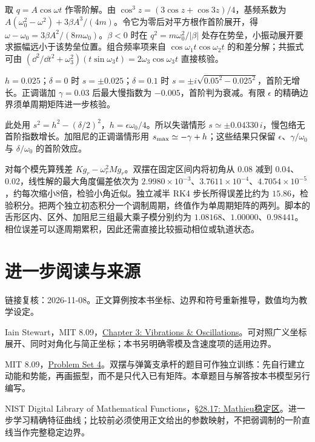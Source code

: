 \begin{bookexercises}
取 $q=A\cos\omega t$ 作零阶解。由 $\cos^3z=(3\cos z+\cos3z)/4$，基频系数为 $A(\omega_0^2-\omega^2)+3\beta A^3/(4m)$。令它为零后对平方根作首阶展开，得 $\omega-\omega_0=3\beta A^2/(8m\omega_0)$。$\beta<0$ 时在 $q^2=m\omega_0^2/|\beta|$ 处存在势垒，小振动展开要求振幅远小于该势垒位置。组合频率项来自 $\cos\omega_1t\cos\omega_2t$ 的和差分解；共振式可由 $(\dd^2/\dd t^2+\omega_3^2)(t\sin\omega_3t)=2\omega_3\cos\omega_3t$ 直接核验。
\item $h=0.025$；$\delta=0$ 时 $s=\pm0.025$；$\delta=0.1$ 时 $s=\pm i\sqrt{0.05^2-0.025^2}$，首阶无增长。正调谐加 $\gamma=0.03$ 后最大慢指数为 $-0.005$，首阶判为衰减。有限 $\epsilon$ 的精确边界须单周期矩阵进一步核验。

此处用 $s^2=h^2-(\delta/2)^2$，$h=\epsilon\omega_0/4$。所以失谐情形 $s\simeq\pm0.04330\,i$，慢包络无首阶指数增长。加阻尼的正调谐情形用 $s_{\rm max}\simeq-\gamma+h$；这些结果只保留 $\epsilon$、$\gamma/\omega_0$ 与 $\delta/\omega_0$ 的首阶效应。
\item 对每个模先算残差 $Kg_r-\omega_r^2Mg_r$。双摆在固定区间内将初角从 $0.08$ 减到 $0.04$、$0.02$，线性解的最大角度偏差依次为 $2.9980\times10^{-3}$、$3.7611\times10^{-4}$、$4.7054\times10^{-5}$，约每次缩小8倍，检验小角近似。独立减半 RK4 步长所得误差比约为 $15.86$，检验积分。把两个独立初态积分一个调制周期，终值作为单周期矩阵的两列。脚本的舌形区内、区外、加阻尼三组最大乘子模分别约为 $1.08168$、$1.00000$、$0.98441$。相位误差可以逐周期累积，因此还需直接比较振动相位或轨道状态。
\end{bookexercises}

\section*{进一步阅读与来源}
链接复核：2026-11-08。正文算例按本书坐标、边界和符号重新推导，数值均为教学设定。
\begin{bookreading}
\item Iain Stewart，MIT 8.09，\href{https://ocw.mit.edu/courses/8-09-classical-mechanics-iii-fall-2014/aa6e7a8b4e0b5eeef24bce949d4fdb27_MIT8_09F14_Chapter_3.pdf}{Chapter 3: Vibrations \& Oscillations}。可对照广义坐标展开、同时对角化与简正坐标；本书另明确零模及含速度项的适用边界。
\item MIT 8.09，\href{https://ocw.mit.edu/courses/8-09-classical-mechanics-iii-fall-2014/4ffa078142eca4a96a4bcb7a90bf0a4c_MIT8_09F14_pset4.pdf}{Problem Set 4}。双摆与弹簧支承杆的题目可作独立训练：先自行建立动能和势能，再画振型，而不是只代入已有矩阵。本章题目与解答按本书模型另行编写。
\item NIST Digital Library of Mathematical Functions，\href{https://dlmf.nist.gov/28.17}{\S28.17: Mathieu稳定区}。进一步学习精确特征曲线；比较前必须使用正文给出的参数映射，不把弱调制的一阶直线当作完整稳定边界。
\end{bookreading}
